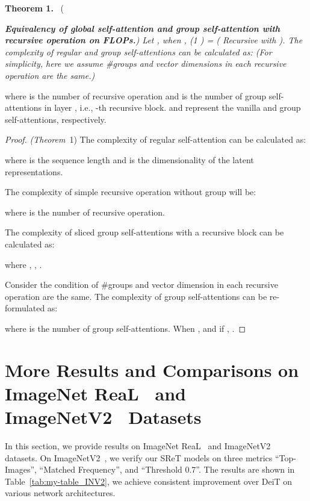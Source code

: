 \documentclass[runningheads]{llncs}
\begin{document}
	{\bf Theorem 1.}
	\  ({\em {\bf \em Equivalency of global self-attention and group self-attention with recursive operation on FLOPs.}) { Let , when  ,  (1 ) =  ( Recursive with  )}.
		The complexity of regular and group self-attentions can be calculated as: (For simplicity, here we assume \#groups and vector dimensions in each recursive operation are the same.)
		
		where  is the number of recursive operation and  is the number of group self-attentions in layer , i.e., -th recursive block.  and  represent the vanilla and group self-attentions, respectively.}
	\begin{proof}
		{\em (Theorem}~1)
		The complexity {\em } of regular self-attention can be calculated as: 
		{\em
			
		}
		where {\em } is the sequence length and {\em } is the dimensionality of the latent representations.
		
		The complexity  of simple recursive operation without group will be:
		{\em 
			
		}
		where {\em } is the number of recursive operation.
		
		The complexity of sliced group self-attentions with a recursive block can be calculated as: 
		{\em 
			
		}
		where {\em }, {\em }, .
		
		Consider the condition of \#groups  and vector dimension  in each recursive operation are the same. The complexity of group self-attentions can be re-formulated as: 
		{\em
			
		}
		where  is the number of group self-attentions. When {\em }, {\em } and if {\em }, {\em }.
	\end{proof}
	
	\section{More Results and Comparisons on ImageNet ReaL~\cite{beyer2020we} and ImageNetV2~\cite{recht2019imagenet} Datasets} \label{INV2}
	
	In this section, we provide results on ImageNet ReaL~\cite{beyer2020we} and ImageNetV2~\cite{recht2019imagenet} datasets. On ImageNetV2~\cite{recht2019imagenet}, we verify our SReT models on three metrics ``Top-Images'', ``Matched Frequency'', and ``Threshold 0.7''. The results are shown in Table~\ref{tab:my-table_INV2}, we achieve consistent improvement over  DeiT  on various network architectures.
	
\end{document}
